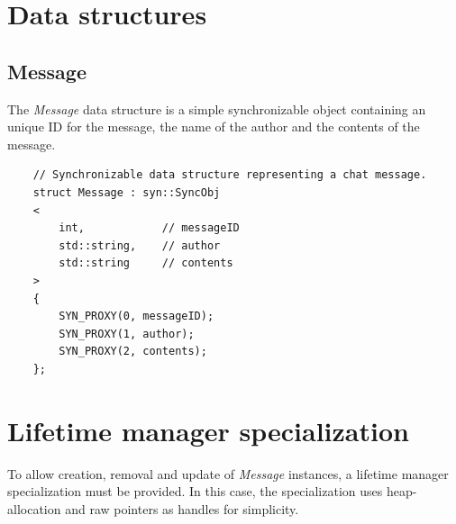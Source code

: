 \documentclass{report}
\begin{document}
        \section{Data structures}

            \subsection{Message}

                The \emph{Message} data structure is a simple synchronizable object containing an unique ID for the message, the name of the author and the contents of the message.

            \begin{verbatim}
    // Synchronizable data structure representing a chat message.
    struct Message : syn::SyncObj
    <
        int,            // messageID
        std::string,    // author
        std::string     // contents
    >
    {
        SYN_PROXY(0, messageID);
        SYN_PROXY(1, author);
        SYN_PROXY(2, contents);
    };
            \end{verbatim}                

        \section{Lifetime manager specialization}

            To allow creation, removal and update of \emph{Message} instances, a lifetime manager specialization must be provided.
            In this case, the specialization uses heap-allocation and raw pointers as handles for simplicity.
\end{document}
